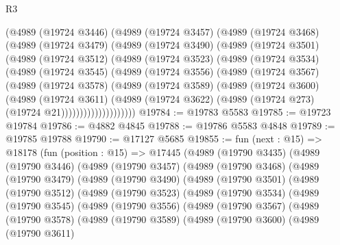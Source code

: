 \begin{lexlean}{R3}
\begin{coremodule}
      (@4989
        (@19724 @3446)
        (@4989
          (@19724 @3457)
          (@4989
            (@19724 @3468)
            (@4989
              (@19724 @3479)
              (@4989
                (@19724 @3490)
                (@4989
                  (@19724 @3501)
                  (@4989
                    (@19724 @3512)
                    (@4989
                      (@19724 @3523)
                      (@4989
                        (@19724 @3534)
                        (@4989
                          (@19724 @3545)
                          (@4989
                            (@19724 @3556)
                            (@4989
                              (@19724 @3567)
                              (@4989
                                (@19724 @3578)
                                (@4989
                                  (@19724 @3589)
                                  (@4989
                                    (@19724 @3600)
                                    (@4989
                                      (@19724 @3611)
                                      (@4989
                                        (@19724 @3622)
                                        (@4989 (@19724 @273) (@19724 @21))))))))))))))))))))
@19784 := @19783 @5583
@19785 := @19723 @19784
@19786 := @4882 @4845
@19788 := @19786 @5583 @4848
@19789 := @19785 @19788
@19790 := @17127 @5685
@19855 := fun (next : @15) =>
  @18178
    (fun (position : @15) =>
    @17445
      (@4989
        (@19790 @3435)
        (@4989
          (@19790 @3446)
          (@4989
            (@19790 @3457)
            (@4989
              (@19790 @3468)
              (@4989
                (@19790 @3479)
                (@4989
                  (@19790 @3490)
                  (@4989
                    (@19790 @3501)
                    (@4989
                      (@19790 @3512)
                      (@4989
                        (@19790 @3523)
                        (@4989
                          (@19790 @3534)
                          (@4989
                            (@19790 @3545)
                            (@4989
                              (@19790 @3556)
                              (@4989
                                (@19790 @3567)
                                (@4989
                                  (@19790 @3578)
                                  (@4989
                                    (@19790 @3589)
                                    (@4989
                                      (@19790 @3600)
                                      (@4989
                                        (@19790 @3611)

\end{coremodule}
\end{lexlean}
